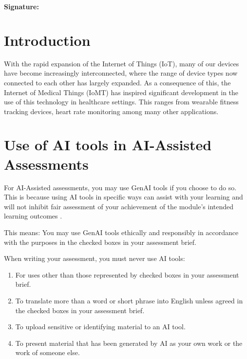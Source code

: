 \documentclass[11pt,a4paper]{article}
\begin{document}
\vspace{1em}
{\bf\noindent Signature:} \hrulefill

\newpage
\clearpage
{} 
%
%
\section{Introduction}
With the rapid expansion of the Internet of Things (IoT), many of our devices have become
increasingly interconnected, where the range of device types now connected to each other 
has largely expanded. As a consequence of this, the Internet of Medical Things (IoMT) has
inspired significant development in the use of this technology in healthcare settings. This
ranges from wearable fitness tracking devices, heart rate monitoring among many other applications.



\section{Use of AI tools in AI-Assisted Assessments}

For AI-Assisted assessments, you may use GenAI tools if you choose to do so. This is because using AI tools in specific ways can assist with your learning and will not inhibit fair assessment of your achievement of the module’s intended learning outcomes \cite{libguidesAI}.

This means: You may use GenAI tools ethically and responsibly in accordance with the purposes in the checked boxes in your assessment brief.

When writing your assessment, you must never use AI tools: 
\begin{enumerate}[leftmargin=.6in]
    \item For uses other than those represented by checked boxes in your assessment brief. 
    \item To translate more than a word or short phrase into English unless agreed in the checked boxes in your assessment brief. 
    \item To upload sensitive or identifying material to an AI tool.
    \item To present material that has been generated by AI as your own work or the work of someone else.   
\end{enumerate}
\end{document}
